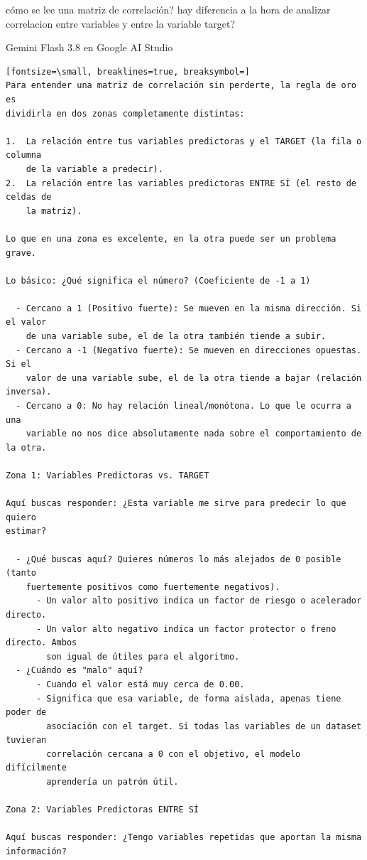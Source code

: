 \documentclass[12pt,a4paper,oneside]{book}
\begin{document}
\begin{iaprompt}
cómo se lee una matriz de correlación? hay diferencia a la hora de analizar correlacion entre variables y entre la variable target?
\end{iaprompt}
\begin{iaresp}{Gemini Flash 3.8 en Google AI Studio}
\begin{Verbatim}[fontsize=\small, breaklines=true, breaksymbol=]
Para entender una matriz de correlación sin perderte, la regla de oro es
dividirla en dos zonas completamente distintas:

1.  La relación entre tus variables predictoras y el TARGET (la fila o columna
    de la variable a predecir).
2.  La relación entre las variables predictoras ENTRE SÍ (el resto de celdas de
    la matriz).

Lo que en una zona es excelente, en la otra puede ser un problema grave.

Lo básico: ¿Qué significa el número? (Coeficiente de -1 a 1)

  - Cercano a 1 (Positivo fuerte): Se mueven en la misma dirección. Si el valor
    de una variable sube, el de la otra también tiende a subir.
  - Cercano a -1 (Negativo fuerte): Se mueven en direcciones opuestas. Si el
    valor de una variable sube, el de la otra tiende a bajar (relación inversa).
  - Cercano a 0: No hay relación lineal/monótona. Lo que le ocurra a una
    variable no nos dice absolutamente nada sobre el comportamiento de la otra.

Zona 1: Variables Predictoras vs. TARGET

Aquí buscas responder: ¿Esta variable me sirve para predecir lo que quiero
estimar?

  - ¿Qué buscas aquí? Quieres números lo más alejados de 0 posible (tanto
    fuertemente positivos como fuertemente negativos).
      - Un valor alto positivo indica un factor de riesgo o acelerador directo.
      - Un valor alto negativo indica un factor protector o freno directo. Ambos
        son igual de útiles para el algoritmo.
  - ¿Cuándo es "malo" aquí?
      - Cuando el valor está muy cerca de 0.00.
      - Significa que esa variable, de forma aislada, apenas tiene poder de
        asociación con el target. Si todas las variables de un dataset tuvieran
        correlación cercana a 0 con el objetivo, el modelo difícilmente
        aprendería un patrón útil.

Zona 2: Variables Predictoras ENTRE SÍ

Aquí buscas responder: ¿Tengo variables repetidas que aportan la misma
información?


\end{Verbatim}
\end{iaresp}
\end{document}
